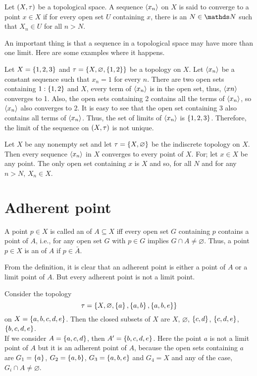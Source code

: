 \documentclass[../main-sheet.tex]{subfiles}
\begin{document}
\begin{defn}
    Let  \((X, \tau)\) be a topological space. A sequence  \(\left\langle x_n\right\rangle\) on  \(X\) is said to converge to a point  \(x \in X \) if for every open
    set  \(U\) containing  \(x\), there is an  \(N \in\N\) such that  \(X_n \in U\) for all  \(n>N\).
\end{defn}
An important thing is that a sequence in a topological space may
have more than one limit. Here are some examples where it
happens.
\begin{ex}
    Let  \(X=\left\{1,2,3\right\}\) and  \(\tau =\left\{X,\varnothing,\left\{1,2\right\}\right\}\) be a
    topology on  \(X\). Let  \(\left\langle x_n\right\rangle\) be a constant sequence such that  \(x_n=1\)
    for every  \(n\). There are two open sets containing  \(1: \left\{1,2\right\}\) and  \(X\),
    every term of  \(\left\langle x_n\right\rangle\) is in the open set, thus,  \(\left\langle xn\right\rangle\) converges to 1.
    Also, the open sets containing 2 contains all the terms of  \(\left\langle x_n\right\rangle\), so
     \(\left\langle x_n\right\rangle\) also converges to 2. It is easy to see that the open set
    containing 3 also contains all terms of  \(\left\langle x_n\right\rangle\). Thus, the set of
    limits of  \(\left\langle x_n\right\rangle\) is  \(\left\{1,2,3\right\}\). Therefore, the limit of the sequence on  \((X, \tau)\) is not unique.
\end{ex}
\begin{ex}
    Let  \(X\) be any nonempty set and let  \(\tau =\left\{X,\varnothing\right\}\) be
    the indiscrete topology on  \(X\). Then every sequence  \(\left\langle x_n\right\rangle\) in  \(X\)
    converges to every point of  \(X\). For; let  \(x \in X\) be any point. The
    only open set containing  \(x\) is  \(X\) and so, for all  \(N\) and for any
     \(n>N\),  \(X_n \in X\).
\end{ex}
\section{Adherent point}
\begin{defn}
    A point  \(p \in X\) is called an  of
     \(A \subseteq X\) iff every open set  \(G\) containing  \(p\) contains a point of  \(A\),
    i.e., for any open set  \(G\) with  \(p \in G\) implies  \(G \cap A\neq\varnothing\).
    Thus, a point  \(p \in X\) is an  of  \(A\) if  \(p \in \bar{A}\).
\end{defn}
From the definition, it is clear that an adherent point is either a
point of  \(A\) or a limit point of  \(A\). But every adherent point is not a
limit point.
\begin{ex}
    Consider the topology
    \[\tau =\left\{X,\varnothing,\left\{a\right\},\left\{a,b\right\},\left\{a,b,e\right\}\right\}\]
    on  \(X = \left\{a,b,c,d,e\right\}\). Then the closed subsets of  \(X\) are
     \(X\),  \(\varnothing\),  \(\left\{c, d\right\}\),  \(\left\{c, d, e\right\}\),  \(\left\{b,c, d, e\right\}\).\\
    If we consider  \(A=\left\{a,c,d\right\}\), then  \(A'=\left\{b,c,d,e\right\}\). Here the
    point  \(a\) is not a limit point of  \(A\) but it is an adherent point of  \(A\),
    because the open sets containing  \(a\) are  \(G_1=\left\{a\right\}\),  \(G_2=\left\{a,b\right\}\),
     \(G_3=\left\{a,b,e\right\}\) and  \(G_4 = X\) and any of the case,  \(G_i \cap A \neq \varnothing\).
\end{ex}
\end{document}
